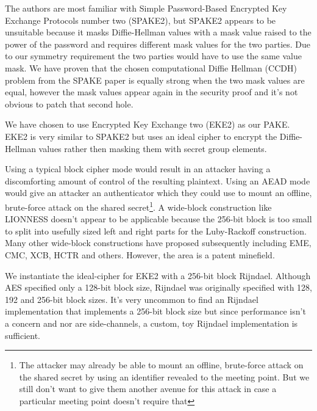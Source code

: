\documentclass[letterpaper,twocolumn,10pt]{article}
\begin{document}
The authors are most familiar with Simple Password-Based Encrypted Key Exchange
Protocols number two (SPAKE2)\cite{abdalla2005simple}, but SPAKE2 appears to be
unsuitable because it masks Diffie-Hellman values with a mask value raised to
the power of the password and requires different mask values for the two
parties. Due to our symmetry requirement the two parties would have to use the
same value mask. We have proven that the chosen computational Diffie Hellman
(CCDH) problem from the SPAKE paper is equally strong when the two mask values
are equal, however the mask values appear again in the security proof and it's
not obvious to patch that second hole.

We have chosen to use Encrypted Key Exchange two
(EKE2)\cite{bellare2000authenticated} as our PAKE. EKE2 is very similar to
SPAKE2 but uses an ideal cipher to encrypt the Diffie-Hellman values rather
then masking them with secret group elements.

Using a typical block cipher mode would
result in an attacker having a discomforting amount of control of the resulting
plaintext. Using an AEAD mode would give an attacker an authenticator which
they could use to mount an offline, brute-force attack on the shared
secret\footnote{The attacker may already be able to mount an offline,
brute-force attack on the shared secret by using an identifier revealed to the
meeting point. But we still don't want to give them another avenue for this
attack in case a particular meeting point doesn't require that}. A wide-block
construction like LIONNESS\cite{anderson1996two} doesn't appear to be
applicable because the 256-bit block is too small to split into usefully sized
left and right parts for the Luby-Rackoff construction. Many other wide-block
constructions have proposed subsequently including
EME\cite{halevi2004parallelizable}, CMC\cite{halevi2004parallelizable},
XCB\cite{mcgrew2004extended}, HCTR\cite{wang2005hctr} and others. However, the
area is a patent minefield.

We instantiate the ideal-cipher for EKE2 with a 256-bit block
Rijndael\cite{daemen2002design}. Although AES specified only a 128-bit block
size, Rijndael was originally specified with 128, 192 and 256-bit block sizes.
It's very uncommon to find an Rijndael implementation that implements a 256-bit
block size but since performance isn't a concern and nor are side-channels, a
custom, toy Rijndael implementation is sufficient.
\end{document}
